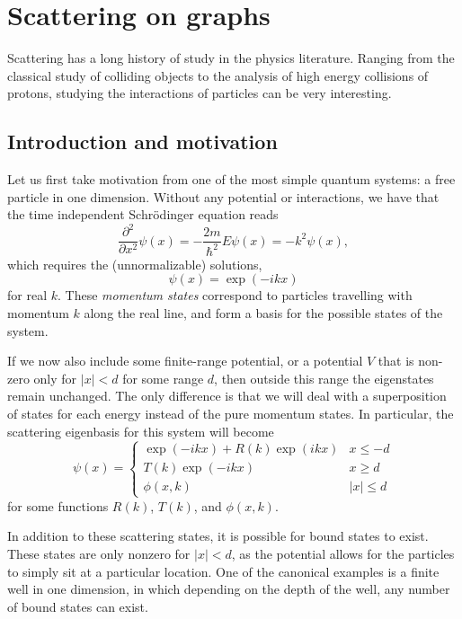 \documentclass[../thesis-main/thesis-main]{subfiles}
\begin{document}
\chapter{Scattering on graphs}

Scattering has a long history of study in the physics literature.  Ranging from the classical study of colliding objects to the analysis of high energy collisions of protons, studying the interactions of particles can be very interesting.


\section{Introduction and motivation}


Let us first take motivation from one of the most simple quantum systems: a free particle in one dimension.  Without any potential or interactions, we have that the time independent Schr\"{o}dinger equation reads
\[
  \frac{\partial^2}{\partial x^2} \psi(x) = -\frac{2m}{\hbar^2}E \psi(x) = -k^2 \psi(x),
\]
which requires the (unnormalizable) solutions,
\[
  \psi(x) = \exp(- i k x) 
\]
for real $k$.  These \textit{momentum states} correspond to particles travelling with momentum $k$ along the real line, and form a basis for the possible states of the system.


If we now also include some finite-range potential, or a potential $V$ that is non-zero only for $|x| < d$ for some range $d$, then outside this range the eigenstates remain unchanged.  The only difference is that we will deal with a superposition of states for each energy instead of the pure momentum states.  In particular, the scattering eigenbasis for this system will become
\[
  \psi(x) = \begin{cases}
    \exp(-i k x) + R(k) \exp(i k x) & x \leq -d\\
    T(k) \exp(- i k x) & x \geq d\\
    \phi(x,k) & |x| \leq d
    \end{cases}
\]
for some functions $R(k)$, $T(k)$, and $\phi(x,k)$.  


In addition to these scattering states, it is possible for bound states to exist.  These states are only nonzero for $|x| <d$, as the potential allows for the particles to simply sit at a particular location. One of the canonical examples is a finite well in one dimension, in which depending on the depth of the well, any number of bound states can exist.
\end{document}
